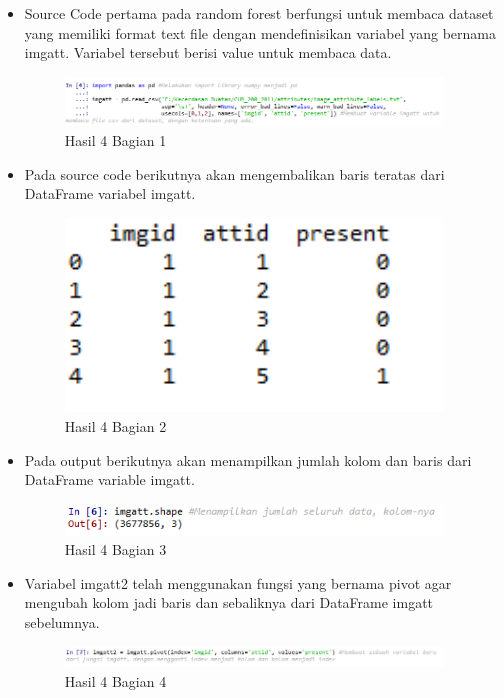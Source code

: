 \begin{itemize}
\item Source Code pertama pada random forest berfungsi untuk membaca dataset yang memiliki format text file dengan mendefinisikan variabel yang bernama imgatt. Variabel tersebut berisi value untuk membaca data.

\begin{figure}[H]
\centerline{\includegraphics[width=10cm]{figures/1174077/3/8.png}}
\caption{Hasil 4 Bagian 1}
\label{labelgambar}
\end{figure}

\item Pada source code berikutnya akan mengembalikan baris teratas dari DataFrame variabel imgatt.

\begin{figure}[H]
\centerline{\includegraphics[width=10cm]{figures/1174077/3/9.png}}
\caption{Hasil 4 Bagian 2}
\label{labelgambar}
\end{figure}

\item Pada output berikutnya akan menampilkan jumlah kolom dan baris dari DataFrame variable imgatt.

\begin{figure}[H]
\centerline{\includegraphics[width=10cm]{figures/1174077/3/10.png}}
\caption{Hasil 4 Bagian 3}
\label{labelgambar}
\end{figure}

\item Variabel imgatt2 telah menggunakan fungsi yang bernama pivot agar mengubah kolom jadi baris dan sebaliknya dari DataFrame imgatt sebelumnya.

\begin{figure}[H]
\centerline{\includegraphics[width=10cm]{figures/1174077/3/11.png}}
\caption{Hasil 4 Bagian 4}
\label{labelgambar}
\end{figure}


\end{itemize}
